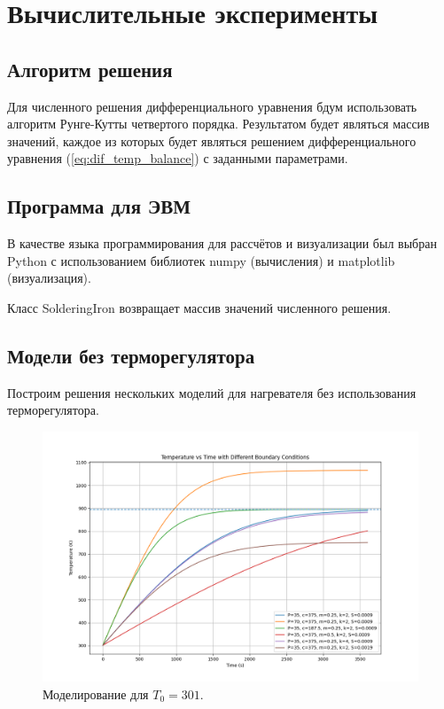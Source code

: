\chapter{Вычислительные эксперименты}
\section{Алгоритм решения}

Для численного решения дифференциального уравнения бдум использовать алгоритм Рунге-Кутты \cite{1964calculus} четвертого порядка. Результатом будет являться массив значений, каждое из которых будет являться решением дифференциального уравнения (\ref{eq:dif_temp_balance}) с заданными параметрами.

\section{Программа для ЭВМ}

В качестве языка программирования для рассчётов и визуализации был выбран Python с использованием библиотек numpy (вычисления) и matplotlib (визуализация).

 

Класс SolderingIron возвращает массив значений численного решения.

\newpage
\section{Модели без терморегулятора}

Построим решения нескольких моделий для нагревателя без использования терморегулятора.

\begin{figure}[h]  %
	\centering
	\includegraphics[width=1\textwidth]{imgs/heater_w.o_controll.png}  %
	\caption{Моделирование для $T_0 = 301$.}  %
	\label{fig:heater_without_controll}  %
\end{figure}

